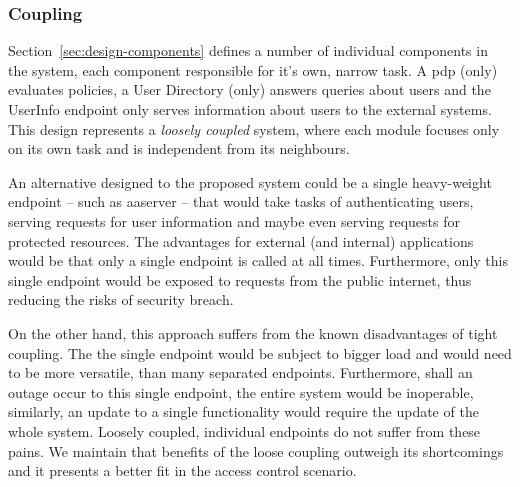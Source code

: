 \subsubsection*{Coupling}
Section~\ref{sec:design-components} defines a number of individual components in the system, each component responsible for it's own, narrow task. A \acrshort{pdp} (only) evaluates policies, a User Directory (only) answers queries about users and the UserInfo endpoint only serves information about users to the external systems. This design represents a \textit{loosely coupled} system, where each module focuses only on its own task and is independent from its neighbours.

An alternative designed to the proposed system could be a single heavy-weight endpoint -- such as \acrshort{aaserver} -- that would take tasks of authenticating users, serving requests for user information and maybe even serving requests for protected resources. The advantages for external (and internal) applications would be that only a single endpoint is called at all times. Furthermore, only this single endpoint would be exposed to requests from the public internet, thus reducing the risks of security breach.

On the other hand, this approach suffers from the known disadvantages of tight coupling. The the single endpoint would be subject to bigger load and would need to be more versatile, than many separated endpoints. Furthermore, shall an outage occur to this single endpoint, the entire system would be inoperable, similarly, an update to a single functionality would require the update of the whole system. Loosely coupled, individual endpoints do not suffer from these pains. We maintain that benefits of the loose coupling outweigh its shortcomings and it presents a better fit in the access control scenario.